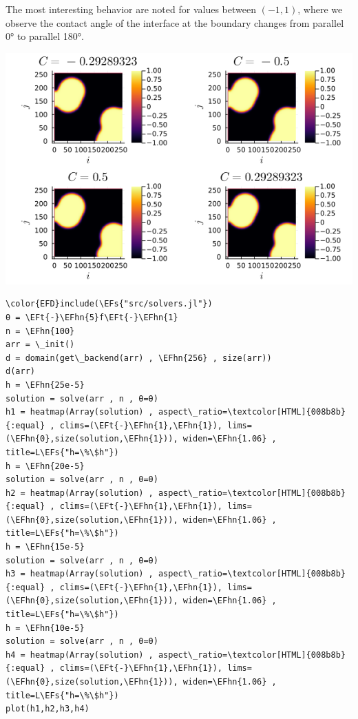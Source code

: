 \documentclass{mimosis}
\newcommand{\EFs}[1]{\textcolor{EFs}{#1}} %
\newcommand{\EFt}[1]{\textcolor{EFt}{#1}} %
\newcommand{\EFhn}[1]{\textcolor{EFhn}{#1}} %
\begin{document}
The most interesting behavior are noted for values between \((-1,1)\), where we observe the contact angle of the interface at the boundary changes from parallel 0° to parallel 180°.
\begin{center}
\includegraphics[width=.9\linewidth]{images/angle-sqrt(2).png}
\label{fig:angle-multiple}
\end{center}

\begin{Code}
\begin{Verbatim}
\color{EFD}include(\EFs{"src/solvers.jl"})
θ = \EFt{-}\EFhn{5}f\EFt{-}\EFhn{1}
n = \EFhn{100}
arr = \_init()
d = domain(get\_backend(arr) , \EFhn{256} , size(arr))
d(arr)
h = \EFhn{25e-5}
solution = solve(arr , n , θ=θ)
h1 = heatmap(Array(solution) , aspect\_ratio=\textcolor[HTML]{008b8b}{:equal} , clims=(\EFt{-}\EFhn{1},\EFhn{1}), lims=(\EFhn{0},size(solution,\EFhn{1})), widen=\EFhn{1.06} , title=L\EFs{"h=\%\$h"})
h = \EFhn{20e-5}
solution = solve(arr , n , θ=θ)
h2 = heatmap(Array(solution) , aspect\_ratio=\textcolor[HTML]{008b8b}{:equal} , clims=(\EFt{-}\EFhn{1},\EFhn{1}), lims=(\EFhn{0},size(solution,\EFhn{1})), widen=\EFhn{1.06} , title=L\EFs{"h=\%\$h"})
h = \EFhn{15e-5}
solution = solve(arr , n , θ=θ)
h3 = heatmap(Array(solution) , aspect\_ratio=\textcolor[HTML]{008b8b}{:equal} , clims=(\EFt{-}\EFhn{1},\EFhn{1}), lims=(\EFhn{0},size(solution,\EFhn{1})), widen=\EFhn{1.06} , title=L\EFs{"h=\%\$h"})
h = \EFhn{10e-5}
solution = solve(arr , n , θ=θ)
h4 = heatmap(Array(solution) , aspect\_ratio=\textcolor[HTML]{008b8b}{:equal} , clims=(\EFt{-}\EFhn{1},\EFhn{1}), lims=(\EFhn{0},size(solution,\EFhn{1})), widen=\EFhn{1.06} , title=L\EFs{"h=\%\$h"})
plot(h1,h2,h3,h4)
\end{Verbatim}
\end{Code}
\end{document}
